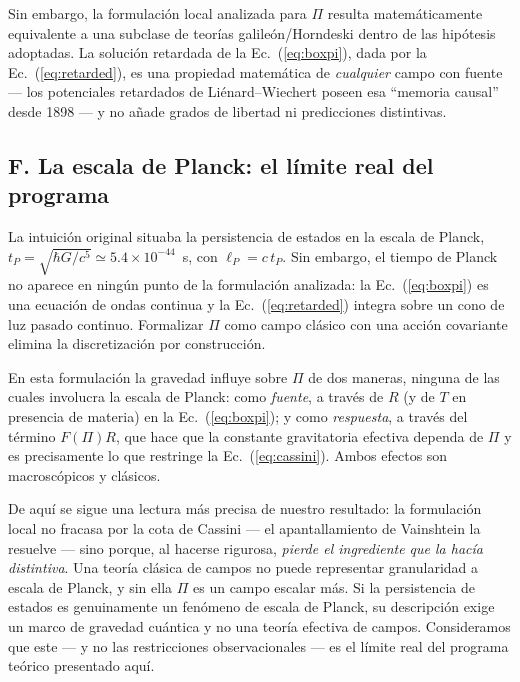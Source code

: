 \documentclass[aps,prd,twocolumn,superscriptaddress,nofootinbib,floatfix]{revtex4-2}
\begin{document}
Sin embargo, la formulaci\'on local analizada para $\Pi$ resulta
matem\'aticamente equivalente a una subclase de teor\'ias
galile\'on/Horndeski \cite{Deffayet2009} dentro de las hip\'otesis
adoptadas. La soluci\'on retardada de la Ec.~(\ref{eq:boxpi}), dada por
la Ec.~(\ref{eq:retarded}), es una propiedad matem\'atica de
\emph{cualquier} campo con fuente --- los potenciales retardados de
Li\'enard--Wiechert poseen esa ``memoria causal'' desde 1898 --- y no
a\~nade grados de libertad ni predicciones distintivas.

\subsection*{F. La escala de Planck: el l\'imite real del programa}

La intuici\'on original situaba la persistencia de estados en la escala
de Planck, $t_P=\sqrt{\hbar G/c^5}\simeq5.4\times10^{-44}$~s, con
$\ell_P=c\,t_P$. Sin embargo, el tiempo de Planck no aparece en ning\'un
punto de la formulaci\'on analizada: la Ec.~(\ref{eq:boxpi}) es una
ecuaci\'on de ondas continua y la Ec.~(\ref{eq:retarded}) integra sobre
un cono de luz pasado continuo. Formalizar $\Pi$ como campo cl\'asico
con una acci\'on covariante elimina la discretizaci\'on por
construcci\'on.

En esta formulaci\'on la gravedad influye sobre $\Pi$ de dos maneras,
ninguna de las cuales involucra la escala de Planck: como
\emph{fuente}, a trav\'es de $R$ (y de $T$ en presencia de materia) en
la Ec.~(\ref{eq:boxpi}); y como \emph{respuesta}, a trav\'es del
t\'ermino $F(\Pi)R$, que hace que la constante gravitatoria efectiva
dependa de $\Pi$ y es precisamente lo que restringe la
Ec.~(\ref{eq:cassini}). Ambos efectos son macrosc\'opicos y cl\'asicos.

De aqu\'i se sigue una lectura m\'as precisa de nuestro resultado: la
formulaci\'on local no fracasa por la cota de Cassini --- el
apantallamiento de Vainshtein la resuelve --- sino porque, al hacerse
rigurosa, \emph{pierde el ingrediente que la hac\'ia distintiva}. Una
teor\'ia cl\'asica de campos no puede representar granularidad a escala
de Planck, y sin ella $\Pi$ es un campo escalar m\'as. Si la
persistencia de estados es genuinamente un fen\'omeno de escala de
Planck, su descripci\'on exige un marco de gravedad cu\'antica y no una
teor\'ia efectiva de campos. Consideramos que este --- y no las
restricciones observacionales --- es el l\'imite real del programa
te\'orico presentado aqu\'i.
\end{document}
